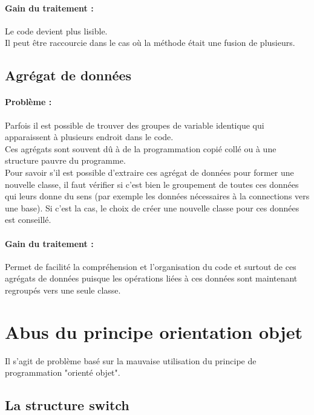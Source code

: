 \documentclass[a4paper,twoside,12pt,openright]{report}
\begin{document}
\paragraph{Gain du traitement :}
Le code devient plus lisible.\\
Il peut être raccourcie dans le cas où la méthode était une fusion de plusieurs.\\

\subsection{Agrégat de données}
\paragraph{Problème :}
Parfois il est possible de trouver des groupes de variable identique qui apparaissent à plusieurs endroit dans le code.\\
Ces agrégats sont souvent dû à de la programmation copié collé ou à une structure pauvre du programme.\\
Pour savoir s'il est possible d'extraire ces agrégat de données pour former une nouvelle classe, il faut vérifier si c'est bien le groupement de toutes ces données qui leurs donne du sens (par exemple les données nécessaires à la connections vers une base). Si c'est la cas, le choix de créer une nouvelle classe pour ces données est conseillé.\\

\paragraph{Gain du traitement :}
Permet de facilité la compréhension et l'organisation du code et surtout de ces agrégats de données puisque les opérations liées à ces données sont maintenant regroupés vers une seule classe.\\

\section{Abus du principe orientation objet}
Il s'agit de problème basé sur la mauvaise utilisation du principe de programmation "orienté objet".\\

\subsection{La structure switch}
\end{document}
